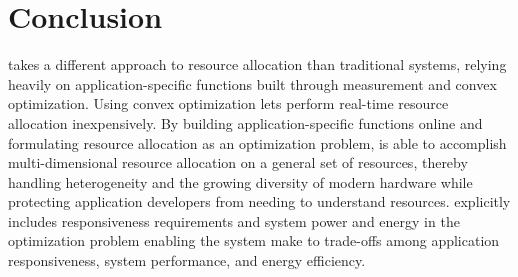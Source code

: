 \section{Conclusion}\label{conclusion}

\pacora takes a different approach to resource allocation than traditional systems, relying heavily on application-specific functions built through measurement and convex optimization.  Using convex optimization lets \pacora perform real-time resource allocation inexpensively.  By building application-specific functions online and formulating resource allocation as an optimization problem, \pacora is able to accomplish multi-dimensional resource allocation on a general set of resources, thereby handling heterogeneity and the growing diversity of modern hardware while protecting application developers from needing to understand resources. \pacora explicitly includes responsiveness requirements and system power and energy in the optimization problem enabling the system make to trade-offs among application responsiveness, system performance, and energy efficiency.




